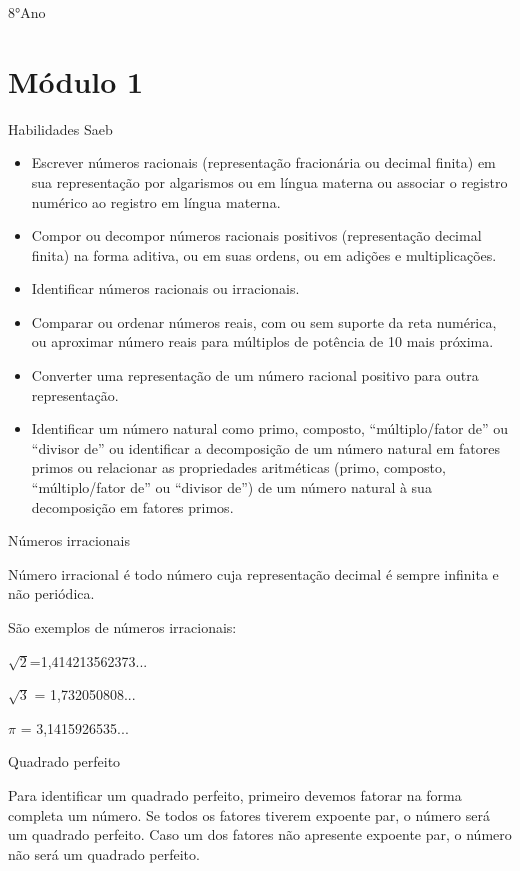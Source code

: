 8°Ano

\hypertarget{muxf3dulo-1}{%
\section{Módulo 1}\label{muxf3dulo-1}}

Habilidades Saeb

\begin{itemize}
\item
  Escrever números racionais (representação fracionária ou decimal
  finita) em sua representação por algarismos ou em língua materna ou
  associar o registro numérico ao registro em língua materna.
\item
  Compor ou decompor números racionais positivos (representação decimal
  finita) na forma aditiva, ou em suas ordens, ou em adições e
  multiplicações.
\item
  Identificar números racionais ou irracionais.
\item
  Comparar ou ordenar números reais, com ou sem suporte da reta
  numérica, ou aproximar número reais para múltiplos de potência de 10
  mais próxima.
\item
  Converter uma representação de um número racional positivo para outra
  representação.
\item
  Identificar um número natural como primo, composto, ``múltiplo/fator
  de'' ou ``divisor de'' ou identificar a decomposição de um número
  natural em fatores primos ou relacionar as propriedades aritméticas
  (primo, composto, ``múltiplo/fator de'' ou ``divisor de'') de um
  número natural à sua decomposição em fatores primos.
\end{itemize}

Números irracionais

Número irracional é todo número cuja representação decimal é sempre
infinita e não periódica.

São exemplos de números irracionais:

\(\sqrt{2}\)=1,414213562373...

\(\sqrt{3}\) = 1,732050808...

\(\pi\) = 3,1415926535...

Quadrado perfeito

Para identificar um quadrado perfeito, primeiro devemos fatorar na forma
completa um número. Se todos os fatores tiverem expoente par, o número
será um quadrado perfeito. Caso um dos fatores não apresente expoente
par, o número não será um quadrado perfeito.

